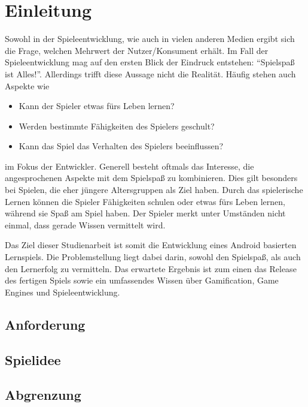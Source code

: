 \section{Einleitung}
Sowohl in der Spieleentwicklung, wie auch in vielen anderen Medien ergibt sich die Frage, welchen Mehrwert der Nutzer/Konsument erhält. Im Fall der Spieleentwicklung mag auf den ersten Blick der Eindruck entstehen: \enquote{Spielspaß ist Alles!}.
Allerdings trifft diese Aussage nicht die Realität. Häufig stehen auch Aspekte wie 
\begin{itemize}
	\item Kann der Spieler etwas fürs Leben lernen?
	\item Werden bestimmte Fähigkeiten des Spielers geschult?
	\item Kann das Spiel das Verhalten des Spielers beeinflussen?
\end{itemize}
im Fokus der Entwickler. Generell besteht oftmals das Interesse, die angesprochenen Aspekte mit dem Spielspaß zu kombinieren. Dies gilt besonders bei Spielen, die eher jüngere Altersgruppen als Ziel haben. Durch das spielerische Lernen können die Spieler Fähigkeiten schulen oder etwas fürs Leben lernen, während sie Spaß am Spiel haben. Der Spieler merkt unter Umständen nicht einmal, dass gerade Wissen vermittelt wird.

Das Ziel dieser Studienarbeit ist somit die Entwicklung eines Android basierten Lernspiels. Die Problemstellung liegt dabei darin, sowohl den Spielspaß, als auch den Lernerfolg zu vermitteln. Das erwartete Ergebnis ist zum einen das Release des fertigen Spiels sowie ein umfassendes Wissen über Gamification, Game Engines und Spieleentwicklung.
\subsection{Anforderung}
\subsection{Spielidee}
\subsection{Abgrenzung}
